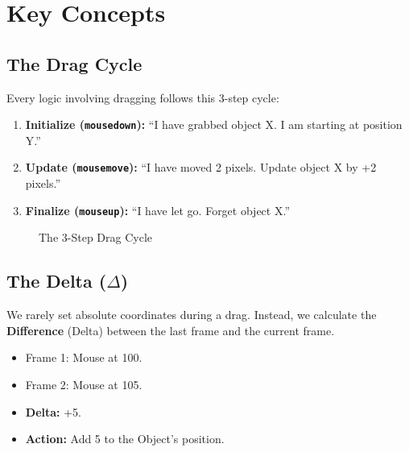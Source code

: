 \documentclass[a4paper,11pt,oneside]{report}
\begin{document}
\section{Key Concepts}

\subsection{The Drag Cycle}

Every logic involving dragging follows this 3-step cycle:
\begin{enumerate}
    \item \textbf{Initialize (\texttt{mousedown}):} ``I have grabbed object X. I am starting at position Y.''
    \item \textbf{Update (\texttt{mousemove}):} ``I have moved 2 pixels. Update object X by +2 pixels.''
    \item \textbf{Finalize (\texttt{mouseup}):} ``I have let go. Forget object X.''
\end{enumerate}

\begin{figure}[H]
\centering
{}
\caption{The 3-Step Drag Cycle}
\label{fig:drag-cycle}
\end{figure}

\subsection{The Delta ($\Delta$)}

We rarely set absolute coordinates during a drag. Instead, we calculate the \textbf{Difference} (Delta) between the last frame and the current frame.
\begin{itemize}
    \item Frame 1: Mouse at 100.
    \item Frame 2: Mouse at 105.
    \item \textbf{Delta:} +5.
    \item \textbf{Action:} Add 5 to the Object's position.
\end{itemize}
\end{document}
